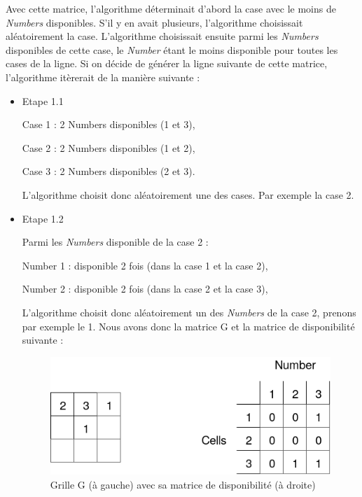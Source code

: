 \documentclass[1]{report}
\begin{document}
        Avec cette matrice, l'algorithme déterminait d'abord la case avec le moins de \textit{Numbers} disponibles. S'il y en avait plusieurs, l'algorithme choisissait aléatoirement la case. L'algorithme choisissait ensuite parmi les \textit{Numbers} disponibles de cette case, le \textit{Number} étant le moins disponible pour toutes les cases de la ligne. Si on décide de générer la ligne suivante de cette matrice, l'algorithme itèrerait de la manière suivante : \newline
        
        \begin{itemize}
            \item{Etape 1.1} \newline

            Case 1 : 2 Numbers disponibles (1 et 3),
            
            Case 2 : 2 Numbers disponibles (1 et 2),
            
            Case 3 : 2 Numbers disponibles (2 et 3). \newline
            
            L'algorithme choisit donc aléatoirement une des cases. Par exemple la case 2. \newline

            \item{Etape 1.2} \newline

            Parmi les \textit{Numbers} disponible de la case 2 :
            
            Number 1 : disponible 2 fois (dans la case 1 et la case 2),
            
            Number 2 : disponible 2 fois (dans la case 2 et la case 3),
            
            L'algorithme choisit donc aléatoirement un des \textit{Numbers} de la case 2, prenons par exemple le 1. Nous avons donc la matrice G et la matrice de disponibilité suivante : \newline
            
            \newpage

            \begin{figure}[H]
                \centering
                    \includegraphics[scale=0.4]{disponibility2.PNG}
                    \caption{Grille G (à gauche) avec sa matrice de disponibilité (à droite)}
            \end{figure}
        

\end{itemize}
\end{document}
